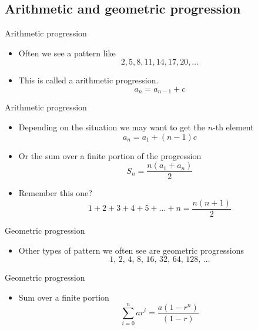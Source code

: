 \documentclass[10pt]{beamer}
\newcommand{\bi}{\begin{itemize}}
\newcommand{\ei}{\end{itemize}}
\begin{document}
\subsection{Arithmetic and geometric progression}

\begin{frame}{Arithmetic progression}
  \vspace{30pt}
  \bi
    \item Often we see a pattern like
      \[
        2 , 5 , 8 , 11 , 14, 17, 20, \ldots
      \]
    \item This is called a arithmetic progression.
      \[
        a_n = a_{n-1} + c
      \]
  \ei
\end{frame}

\begin{frame}{Arithmetic progression}
  \vspace{30pt}
  \bi
    \item Depending on the situation we may want to get the $n$-th element
      \[
        a_n = a_1 + (n-1) c
      \]
    \item Or the sum over a finite portion of the progression
      \[
        S_n = \frac{n(a_1 + a_n)}{2}
      \]
    \item Remember this one?
      \[
        1 + 2 + 3 + 4 + 5 + \ldots + n = \frac{n(n+1)}{2}
      \]
  \ei
\end{frame}

\begin{frame}{Geometric progression}
  \vspace{30pt}
  \bi
    \item Other types of pattern we often see are geometric progressions
      \[
        1,\, 2,\, 4,\, 8,\, 16,\, 32,\, 64,\, 128,\, \ldots
      \]
  \ei
\end{frame}

\begin{frame}{Geometric progression}
  \vspace{30pt}
  \bi
    \item Sum over a finite portion
      \[
        \sum_{i = 0}^n ar^i =  \frac{a(1-r^n)}{(1-r)}
      \]
  \ei
\end{frame}
\end{document}
